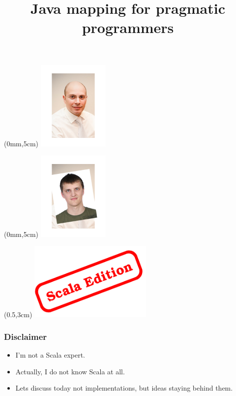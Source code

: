\documentclass[14pt]{beamer}
\begin{document}
\title{Java mapping for pragmatic programmers}

\newcommand{\smaller}[1] {
  {\scriptsize {#1}}
}

\begin{frame}[t]
    \titlepage
    \begin{textblock*}{20mm}(0mm,5cm)%
      \includegraphics[width=35mm]{start1.png}
    \end{textblock*}
\end{frame}

\begin{frame}[t]
    \titlepage
    \begin{textblock*}{20mm}(0mm,5cm)%
      \includegraphics[width=35mm]{start2.png}
    \end{textblock*}
    \begin{textblock*}{20mm}(0.5\textwidth,3cm)%
      \includegraphics[width=6cm]{stamp.png}
    \end{textblock*}
\end{frame}


\frame
{\frametitle{Disclaimer}
\begin{itemize}
  \item<1> I'm not a Scala expert.
  \item<1> Actually, I do not know Scala at all.
  \item<1> Lets discuss today not implementations, but ideas staying behind them.
\end{itemize}
}
\end{document}
